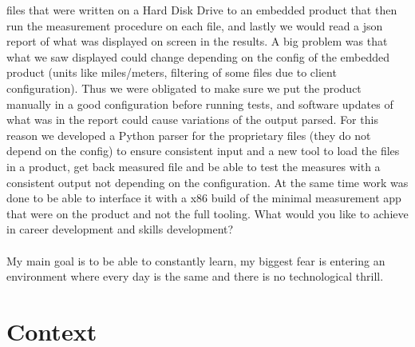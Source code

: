\documentclass{exam}
\begin{document}
\begin{questions}
files that were written on a Hard Disk Drive to an embedded product that then run the measurement procedure on each file, 
and lastly we would read a json report of what was displayed on screen in the results. 
A big problem was that what we saw displayed could change depending on the config of the embedded product (units like miles/meters, filtering of some files due to client configuration).
Thus we were obligated to make sure we put the product manually in a good configuration before running tests, and software updates of what was in the report could cause variations of the output parsed.
For this reason we developed a Python parser for the proprietary files (they do not depend on the config) to ensure consistent input and a new tool to load the files in a product,
get back measured file and be able to test the measures with a consistent output not depending on the configuration. 
At the same time work was done to be able to interface it with a x86 build of the minimal measurement app that were on the product and not the full tooling.
\question What would you like to achieve in career development and skills development?
\\~\\
My main goal is to be able to constantly learn, my biggest fear is entering an environment where every day is the same and there is no technological thrill.
\end{questions}

\section*{Context}
\end{document}
